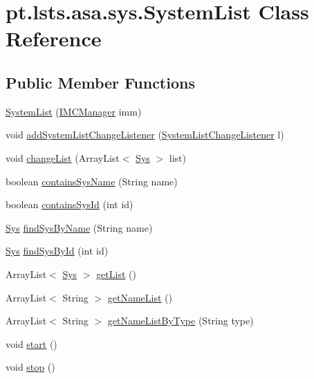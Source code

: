 \hypertarget{classpt_1_1lsts_1_1asa_1_1sys_1_1SystemList}{}\section{pt.\+lsts.\+asa.\+sys.\+System\+List Class Reference}
\label{classpt_1_1lsts_1_1asa_1_1sys_1_1SystemList}
\subsection*{Public Member Functions}
\begin{DoxyCompactItemize}
\item 
\hyperlink{classpt_1_1lsts_1_1asa_1_1sys_1_1SystemList_a560a4426e7a9bf372868034239390672}{System\+List} (\hyperlink{classpt_1_1lsts_1_1asa_1_1managers_1_1IMCManager}{I\+M\+C\+Manager} imm)
\item 
void \hyperlink{classpt_1_1lsts_1_1asa_1_1sys_1_1SystemList_afe59f36f8485e1b59e3f2a9577b90633}{add\+System\+List\+Change\+Listener} (\hyperlink{interfacept_1_1lsts_1_1asa_1_1listenners_1_1SystemListChangeListener}{System\+List\+Change\+Listener} l)
\item 
void \hyperlink{classpt_1_1lsts_1_1asa_1_1sys_1_1SystemList_adca42b514f9c5aa0fa22151b766490ea}{change\+List} (Array\+List$<$ \hyperlink{classpt_1_1lsts_1_1asa_1_1sys_1_1Sys}{Sys} $>$ list)
\item 
boolean \hyperlink{classpt_1_1lsts_1_1asa_1_1sys_1_1SystemList_a32b7b6137f5551b47af60af7c4dab238}{contains\+Sys\+Name} (String name)
\item 
boolean \hyperlink{classpt_1_1lsts_1_1asa_1_1sys_1_1SystemList_aa9d076d2cca90e547d004d078e618d59}{contains\+Sys\+Id} (int id)
\item 
\hyperlink{classpt_1_1lsts_1_1asa_1_1sys_1_1Sys}{Sys} \hyperlink{classpt_1_1lsts_1_1asa_1_1sys_1_1SystemList_a09765da2052f55a6681f1a9afd834cdb}{find\+Sys\+By\+Name} (String name)
\item 
\hyperlink{classpt_1_1lsts_1_1asa_1_1sys_1_1Sys}{Sys} \hyperlink{classpt_1_1lsts_1_1asa_1_1sys_1_1SystemList_a831997ba7282ac1062bc34e46adbd30f}{find\+Sys\+By\+Id} (int id)
\item 
Array\+List$<$ \hyperlink{classpt_1_1lsts_1_1asa_1_1sys_1_1Sys}{Sys} $>$ \hyperlink{classpt_1_1lsts_1_1asa_1_1sys_1_1SystemList_a5d442f08c33d72123d1673650fd2975e}{get\+List} ()
\item 
Array\+List$<$ String $>$ \hyperlink{classpt_1_1lsts_1_1asa_1_1sys_1_1SystemList_a51d0cf4d583420807f2497418342648a}{get\+Name\+List} ()
\item 
Array\+List$<$ String $>$ \hyperlink{classpt_1_1lsts_1_1asa_1_1sys_1_1SystemList_a9af6ea7aa5cca50cbb45a72bbe5cfa6d}{get\+Name\+List\+By\+Type} (String type)
\item 
void \hyperlink{classpt_1_1lsts_1_1asa_1_1sys_1_1SystemList_a2ee385876fe6cff395fd43f1c4a8079c}{start} ()
\item 
void \hyperlink{classpt_1_1lsts_1_1asa_1_1sys_1_1SystemList_a7c8dada0cf44535221a13781e207cf45}{stop} ()
\end{DoxyCompactItemize}
